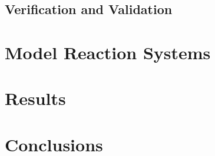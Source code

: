 \documentclass[english,letterpaper,12pt]{article}
\begin{document}
\begin{doublespacing}
\subsection{Verification and Validation} %
\label{sub:verification-validation}



\section{Model Reaction Systems} %
\label{sec:model-systems}

\section{Results} %
\label{sec:results}

\section{Conclusions} %
\label{sec:conclusions}


\end{doublespacing}



\end{document}
